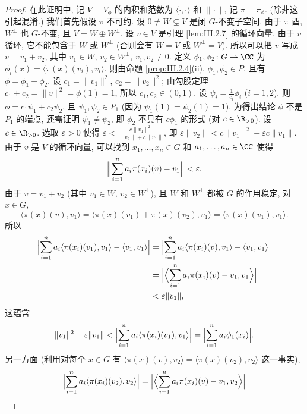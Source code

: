 \begin{proof}
在此证明中, 记 $V = V_{\phi}$ 的内积和范数为 $\langle \cdot, \cdot \rangle$ 和 $\|\cdot\|$, 记 $\pi = \pi_{\phi}$. (除非这引起混淆.)
我们首先假设 $\pi$ 不可约. 设 $0 \neq W \subsetneq V$ 是闭 $G$-不变子空间. 由于 $\pi$ 酉, $W^{\perp}$ 也 $G$-不变, 且 $V = W \oplus W^{\perp}$. 设 $v \in V$ 是引理 \ref{lem:III.2.7} 的循环向量. 由于 $v$ 循环, 它不能包含于 $W$ 或 $W^{\perp}$ (否则会有 $W = V$ 或 $W^{\perp} = V$). 所以可以把 $v$ 写成 $v = v_1 + v_2$, 其中 $v_1 \in W$, $v_2 \in W^{\perp}$, $v_1, v_2 \neq 0$. 定义 $\phi_1, \phi_2 \colon G \to \CC$ 为 $\phi_i(x) = \langle \pi(x)(v_i), v_i \rangle$. 则由命题 \ref{prop:III.2.4}(ii), $\phi_1, \phi_2 \in P$, 且有 $\phi = \phi_1 + \phi_2$. 设 $c_1 = \|v_1\|^2$, $c_2 = \|v_2\|^2$; 由勾股定理 $c_1 + c_2 = \|v\|^2 = \phi(1) = 1$, 所以 $c_1, c_2 \in (0, 1)$. 设 $\psi_i = \frac{1}{c_i}\phi_i$ ($i = 1, 2$). 则 $\phi = c_1\psi_1 + c_2\psi_2$, 且 $\psi_1, \psi_2 \in P_1$ (因为 $\psi_1(1) = \psi_2(1) = 1$). 为得出结论 $\phi$ 不是 $P_1$ 的端点, 还需证明 $\psi_1 \neq \psi_2$, 即 $\phi_2$ 不具有 $c\phi_1$ 的形式 (对 $c \in \R_{>0}$).
设 $c \in \R_{>0}$. 选取 $\varepsilon > 0$ 使得 $\varepsilon < \frac{c\|v_1\|^2}{\|v_2\| + c\|v_1\|}$, 即 $\varepsilon\|v_2\| < c\|v_1\|^2 - \varepsilon c\|v_1\|$. 由于 $v$ 是 $V$ 的循环向量, 可以找到 $x_1, \ldots, x_n \in G$ 和 $a_1, \ldots, a_n \in \CC$ 使得
\[
\Bigl\|\sum_{i=1}^n a_i\pi(x_i)(v) - v_1\Bigr\| < \varepsilon.
\]
由于 $v = v_1 + v_2$ (其中 $v_1 \in W$, $v_2 \in W^{\perp}$), 且 $W$ 和 $W^{\perp}$ 都被 $G$ 的作用稳定, 对 $x \in G$,
\[
\langle \pi(x)(v), v_1 \rangle = \langle \pi(x)(v_1) + \pi(x)(v_2), v_1 \rangle = \langle \pi(x)(v_1), v_1 \rangle.
\]
所以
\begin{align*}
\Bigl|\sum_{i=1}^n a_i\langle \pi(x_i)(v_1), v_1 \rangle - \langle v_1, v_1 \rangle\Bigr| &= \Bigl|\sum_{i=1}^n a_i\langle \pi(x_i)(v), v_1 \rangle - \langle v_1, v_1 \rangle\Bigr| \\
&= \Bigl|\Bigl\langle \sum_{i=1}^n a_i\pi(x_i)(v) - v_1, v_1 \Bigr\rangle\Bigr| \\
&< \varepsilon\|v_1\|,
\end{align*}
这蕴含
\[
\|v_1\|^2 - \varepsilon\|v_1\| < \Bigl|\sum_{i=1}^n a_i\langle \pi(x_i)(v_1), v_1 \rangle\Bigr| = \Bigl|\sum_{i=1}^n a_i\phi_1(x_i)\Bigr|.
\]
另一方面 (利用对每个 $x \in G$ 有 $\langle \pi(x)(v), v_2 \rangle = \langle \pi(x)(v_2), v_2 \rangle$ 这一事实),
\begin{align*}
\Bigl|\sum_{i=1}^n a_i\langle \pi(x_i)(v_2), v_2 \rangle\Bigr| &= \Bigl|\Bigl\langle \sum_{i=1}^n a_i\pi(x_i)(v) - v_1, v_2 \Bigr\rangle\Bigr| \\

\end{align*}
\end{proof}
